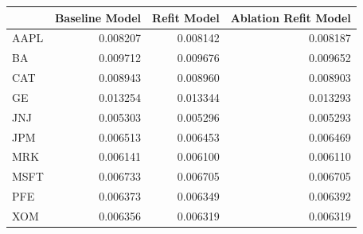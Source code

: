 \begin{tabular}{lrrr}
\toprule
 & Baseline Model & Refit Model & Ablation Refit Model \\
\midrule
AAPL & 0.008207 & 0.008142 & 0.008187 \\
BA & 0.009712 & 0.009676 & 0.009652 \\
CAT & 0.008943 & 0.008960 & 0.008903 \\
GE & 0.013254 & 0.013344 & 0.013293 \\
JNJ & 0.005303 & 0.005296 & 0.005293 \\
JPM & 0.006513 & 0.006453 & 0.006469 \\
MRK & 0.006141 & 0.006100 & 0.006110 \\
MSFT & 0.006733 & 0.006705 & 0.006705 \\
PFE & 0.006373 & 0.006349 & 0.006392 \\
XOM & 0.006356 & 0.006319 & 0.006319 \\
\bottomrule
\end{tabular}
